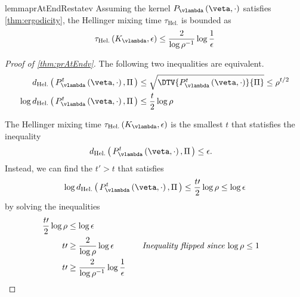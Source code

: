 \begin{restatable}[]{lemma}{prAtEndRestatev}\label{thm:prAtEndv}\label {thm:mixing_time} Assuming the kernel \(P_{\vlambda }\left (\veta , \cdot \right )\) satisfies \cref {thm:ergodicity}, the Hellinger mixing time \(\tau _{\text {Hel.}}\) is bounded as \begin {align*} \tau _{\text {Hel.}}\left (K_{\vlambda }, \epsilon \right ) \leq \frac {2}{\log \rho ^{-1}} \log \frac {1}{\epsilon } \end {align*}\end{restatable}
\label{proofsection:prAtEndv}\begin{proof}[Proof of \autoref{thm:prAtEndv}]\label{proof:prAtEndv}The following two inequalities are equivalent. \begin {align*} d_{\text {Hel.}}\left (\, P^t_{\vlambda }\left (\veta , \cdot \right ), \Pi \,\right ) &\leq \sqrt {\DTV { P^t_{\vlambda }\left (\veta , \cdot \right )}{\Pi }} \leq \rho ^{t / 2} \\ \log d_{\text {Hel.}}\left (\, P^t_{\vlambda }\left (\veta , \cdot \right ), \Pi \,\right ) &\leq \frac {t}{2} \log \rho \end {align*} \par The Hellinger mixing time \(\tau _{\text {Hel.}}\left (K_{\vlambda }, \epsilon \right )\) is the smallest \(t\) that statisfies the inequality \begin {align*} d_{\text {Hel.}}\left (\, P^t_{\vlambda }\left (\veta , \cdot \right ), \Pi \,\right ) &\leq \epsilon . \end {align*} Instead, we can find the \(t\prime > t\) that satisfies \begin {align*} \log d_{\text {Hel.}}\left (\, P^t_{\vlambda }\left (\veta , \cdot \right ), \Pi \,\right ) \leq \frac {t\prime }{2} \log \rho \leq \log \epsilon \end {align*} by solving the inequalities \begin {alignat*}{2} \frac {t\prime }{2} \log \rho &\leq \log \epsilon \\ t\prime &\geq \frac {2}{\log \rho } \log \epsilon &&\quad \text {\textit {Inequality flipped since \(\log \rho \leq 1\)}} \\ t\prime &\geq \frac {2}{\log \rho ^{-1}} \log \frac {1}{\epsilon } \end {alignat*}\end{proof}
\prAtEndRestatevi*
